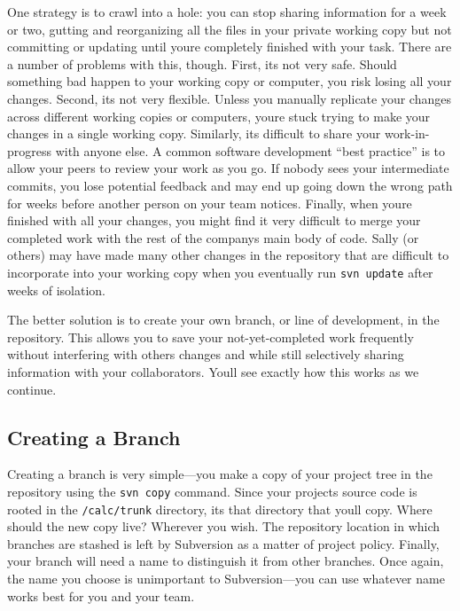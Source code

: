 One strategy is to crawl into a hole: you can stop sharing information
for a week or two, gutting and reorganizing all the files in your
private working copy but not committing or updating until
you\textquotesingle re completely finished with your task. There are a
number of problems with this, though. First, it\textquotesingle s not
very safe. Should something bad happen to your working copy or computer,
you risk losing all your changes. Second, it\textquotesingle s not very
flexible. Unless you manually replicate your changes across different
working copies or computers, you\textquotesingle re stuck trying to make
your changes in a single working copy. Similarly, it\textquotesingle s
difficult to share your work-in-progress with anyone else. A common
software development ``best practice'' is to allow your peers to review
your work as you go. If nobody sees your intermediate commits, you lose
potential feedback and may end up going down the wrong path for weeks
before another person on your team notices. Finally, when
you\textquotesingle re finished with all your changes, you might find it
very difficult to merge your completed work with the rest of the
company\textquotesingle s main body of code. Sally (or others) may have
made many other changes in the repository that are difficult to
incorporate into your working copy when you eventually run
\texttt{svn\ update} after weeks of isolation.

The better solution is to create your own branch, or line of
development, in the repository. This allows you to save your
not-yet-completed work frequently without interfering with
others\textquotesingle{} changes and while still selectively sharing
information with your collaborators. You\textquotesingle ll see exactly
how this works as we continue.

\subsection{Creating a Branch}\label{svn.branchmerge.using.create}

Creating a branch is very simple---you make a copy of your project tree
in the repository using the \texttt{svn\ copy} command. Since your
project\textquotesingle s source code is rooted in the
\texttt{/calc/trunk} directory, it\textquotesingle s that directory that
you\textquotesingle ll copy. Where should the new copy live? Wherever
you wish. The repository location in which branches are stashed is left
by Subversion as a matter of project policy. Finally, your branch will
need a name to distinguish it from other branches. Once again, the name
you choose is unimportant to Subversion---you can use whatever name
works best for you and your team.

